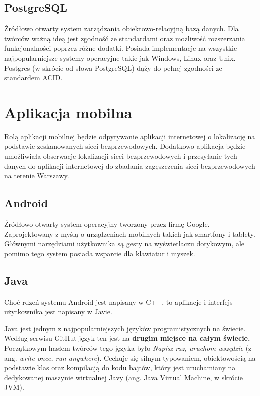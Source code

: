
\subsection{PostgreSQL}
Źródłowo otwarty system zarządzania obiektowo-relacyjną bazą danych. Dla twórców ważną ideą jest zgodność ze standardami oraz możliwość rozszerzania funkcjonalności poprzez różne dodatki. Posiada implementacje na wszystkie najpopularniejsze systemy operacyjne takie jak Windows, Linux oraz Unix. Postgres (w skrócie od słowa PostgreSQL) dąży do pełnej zgodności ze standardem ACID.\cite{PostgresWiki}

\section{Aplikacja mobilna}
Rolą aplikacji mobilnej będzie odpytywanie aplikacji internetowej o lokalizację na podstawie zeskanowanych sieci bezprzewodowych. Dodatkowo aplikacja będzie umożliwiała obserwacje lokalizacji sieci bezprzewodowych i przesyłanie tych danych do aplikacji internetowej do zbadania zagęszczenia sieci bezprzewodowych na terenie Warszawy.

\subsection{Android}
Źródłowo otwarty system operacyjny tworzony przez firmę Google. Zaprojektowany z myślą o urządzeniach mobilnych takich jak smartfony i tablety. Głównymi narzędziami użytkownika są gesty na wyświetlaczu dotykowym, ale pomimo tego system posiada wsparcie dla klawiatur i myszek.\cite{AndroidWiki}

\subsection{Java}
Choć rdzeń systemu Android jest napisany w C++, to aplikacje i interfejs użytkownika jest napisany w Javie.\cite{AndroidWiki}

Java jest jednym z najpopularniejszych języków programistycznych na świecie. Według serwisu GitHut język ten jest na \textbf{drugim miejsce na całym świecie.}\cite{GithutStats2017} Początkowym hasłem twórców tego języka było \textit{Napisz raz, uruchom wszędzie} (z ang. \textit{write once, run anywhere}). Cechuje się silnym typowaniem, obiektowością na podstawie klas oraz kompilacją do kodu bajtów, który jest uruchamiany na dedykowanej maszynie wirtualnej Javy (ang. Java Virtual Machine, w skrócie JVM).\cite{JvmWiki}\cite{JavaWiki}

